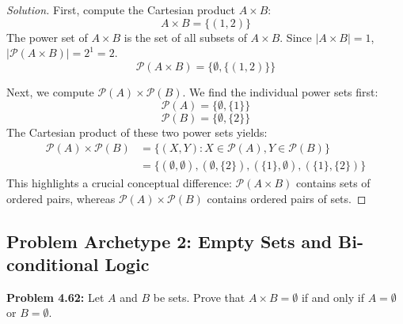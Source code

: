 \documentclass[12pt]{article}
\theoremstyle{definition}
\theoremstyle{remark}
\begin{document}
\begin{proof}[Solution]
First, compute the Cartesian product $A \times B$:
\[ A \times B = \{(1, 2)\} \]
The power set of $A \times B$ is the set of all subsets of $A \times B$. Since $|A \times B| = 1$, $|\mathcal{P}(A \times B)| = 2^1 = 2$.
\[ \mathcal{P}(A \times B) = \{\emptyset, \{(1, 2)\}\} \]

Next, we compute $\mathcal{P}(A) \times \mathcal{P}(B)$. We find the individual power sets first:
\[ \mathcal{P}(A) = \{\emptyset, \{1\}\} \]
\[ \mathcal{P}(B) = \{\emptyset, \{2\}\} \]
The Cartesian product of these two power sets yields:
\begin{align*}
\mathcal{P}(A) \times \mathcal{P}(B) &= \{ (X, Y) : X \in \mathcal{P}(A), Y \in \mathcal{P}(B) \} \\
&= \{ (\emptyset, \emptyset), (\emptyset, \{2\}), (\{1\}, \emptyset), (\{1\}, \{2\}) \}
\end{align*}
This highlights a crucial conceptual difference: $\mathcal{P}(A \times B)$ contains sets of ordered pairs, whereas $\mathcal{P}(A) \times \mathcal{P}(B)$ contains ordered pairs of sets.
\end{proof}

\subsection{Problem Archetype 2: Empty Sets and Bi-conditional Logic}

\textbf{Problem 4.62:} Let $A$ and $B$ be sets. Prove that $A \times B = \emptyset$ if and only if $A = \emptyset$ or $B = \emptyset$.
\end{document}
